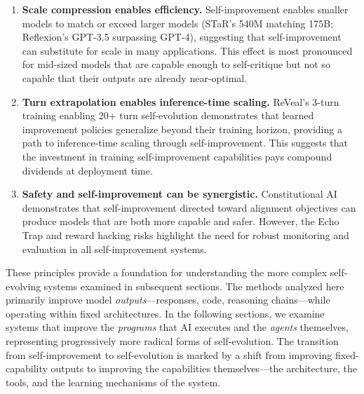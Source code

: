 \begin{enumerate}
    \item \textbf{Scale compression enables efficiency.} Self-improvement enables smaller models to match or exceed larger models (STaR's 540M matching 175B; Reflexion's GPT-3.5 surpassing GPT-4), suggesting that self-improvement can substitute for scale in many applications. This effect is most pronounced for mid-sized models that are capable enough to self-critique but not so capable that their outputs are already near-optimal.

    \item \textbf{Turn extrapolation enables inference-time scaling.} ReVeal's 3-turn training enabling 20+ turn self-evolution demonstrates that learned improvement policies generalize beyond their training horizon, providing a path to inference-time scaling through self-improvement. This suggests that the investment in training self-improvement capabilities pays compound dividends at deployment time.

    \item \textbf{Safety and self-improvement can be synergistic.} Constitutional AI demonstrates that self-improvement directed toward alignment objectives can produce models that are both more capable and safer. However, the Echo Trap and reward hacking risks highlight the need for robust monitoring and evaluation in all self-improvement systems.
\end{enumerate}

These principles provide a foundation for understanding the more complex self-evolving systems examined in subsequent sections. The methods analyzed here primarily improve model \emph{outputs}---responses, code, reasoning chains---while operating within fixed architectures. In the following sections, we examine systems that improve the \emph{programs} that AI executes and the \emph{agents} themselves, representing progressively more radical forms of self-evolution. The transition from self-improvement to self-evolution is marked by a shift from improving fixed-capability outputs to improving the capabilities themselves---the architecture, the tools, and the learning mechanisms of the system.

